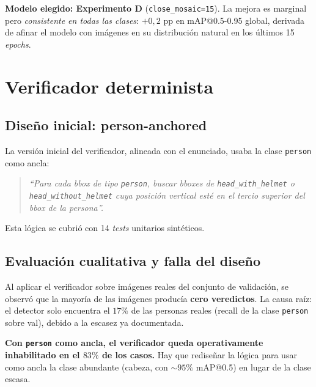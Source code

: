 \documentclass[journal,onecolumn,11pt]{IEEEtran}
\begin{document}
\begin{decision}
\textbf{Modelo elegido: Experimento D} (\texttt{close\_mosaic=15}).
La mejora es marginal pero \emph{consistente en todas las clases}:
$+0{,}2$ pp en mAP@0.5-0.95 global, derivada de afinar el modelo
con imágenes en su distribución natural en los últimos 15
\textit{epochs}.
\end{decision}

\section{Verificador determinista}

\subsection{Diseño inicial: person-anchored}

La versión inicial del verificador, alineada con el enunciado,
usaba la clase \texttt{person} como ancla:

\begin{quotation}
\textit{``Para cada bbox de tipo \texttt{person}, buscar bboxes de
\texttt{head\_with\_helmet} o \texttt{head\_without\_helmet} cuya
posición vertical esté en el tercio superior del bbox de la
persona''.}
\end{quotation}

Esta lógica se cubrió con 14 \textit{tests} unitarios sintéticos.

\subsection{Evaluación cualitativa y falla del diseño}

Al aplicar el verificador sobre imágenes reales del conjunto de
validación, se observó que la mayoría de las imágenes producía
\textbf{cero veredictos}. La causa raíz: el detector solo encuentra
el $17\%$ de las personas reales (recall de la clase
\texttt{person} sobre val), debido a la escasez ya documentada.

\begin{hallazgo}
\textbf{Con \texttt{person} como ancla, el verificador queda
operativamente inhabilitado en el $83\%$ de los casos.} Hay que
rediseñar la lógica para usar como ancla la clase abundante (cabeza,
con $\sim 95\%$ mAP@0.5) en lugar de la clase escasa.
\end{hallazgo}
\end{document}
